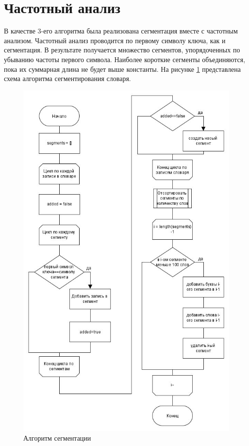 \section{Частотный анализ}
В качестве 3-его алгоритма была реализована сегментация вместе с частотным анализом. Частотный анализ проводится по первому символу ключа, как и сегментация. В результате получается множество сегментов, упорядоченных по убыванию частоты первого символа. Наиболее короткие сегменты объединяются, пока их суммарная длина не будет выше константы. На рисунке \ref{fig:segmentation} представлена схема алгоритма сегментирования словаря.
\begin{figure}[H]
	\centering
	\includegraphics[height=0.8\textheight]{src/segmentation}
	\caption{Алгоритм сегментации}
	\label{fig:segmentation}
\end{figure}
